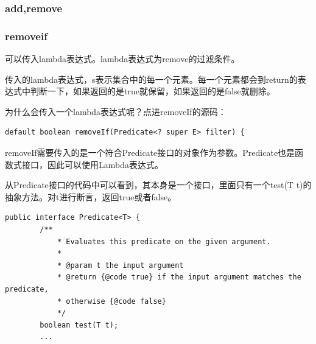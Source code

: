 \subsubsection*{add,remove}


\subsubsection*{removeif}
可以传入lambda表达式。lambda表达式为remove的过滤条件。


传入的lambda表达式，s表示集合中的每一个元素。每一个元素都会到return的表达式中判断一下，如果返回的是true就保留，如果返回的是false就删除。

为什么会传入一个lambda表达式呢？点进removeIf的源码：

\begin{lstlisting}[style=Java]
    default boolean removeIf(Predicate<? super E> filter) {
\end{lstlisting}

removeIf需要传入的是一个符合Predicate接口的对象作为参数。Predicate也是函数式接口，因此可以使用Lambda表达式。

从Predicate接口的代码中可以看到，其本身是一个接口，里面只有一个test(T t)的抽象方法。对t进行断言，返回true或者false。

\begin{lstlisting}[style=Java]
    public interface Predicate<T> {
        /**
            * Evaluates this predicate on the given argument.
            *
            * @param t the input argument
            * @return {@code true} if the input argument matches the predicate,
            * otherwise {@code false}
            */
        boolean test(T t);
        ...
\end{lstlisting}



